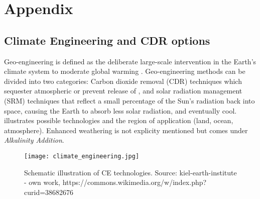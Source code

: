\chapter{Appendix}
\section{Climate Engineering and CDR options}\label{sec:app_ce}
Geo-engineering is defined as the deliberate large-scale intervention in the Earth's climate system to moderate global warming \citep{shepherd2009}. Geo-engineering methods can be divided into two categories: Carbon dioxide removal (CDR) techniques which sequester atmospheric  or prevent release of , and solar radiation management (SRM) techniques that reflect a small percentage of the Sun's radiation back into space, causing the Earth to absorb less solar radiation, and eventually cool.  illustrates possible technologies and the region of application (land, ocean, atmosphere). Enhanced weathering is not explicity mentioned but comes under \textit{Alkalinity Addition}. 
\begin{figure}[h]
\centering
\texttt{[image: climate\_engineering.jpg]}
\caption{Schematic illustration of CE technologies. Source: kiel-earth-institute - own work, https://commons.wikimedia.org/w/index.php?curid=38682676}
\label{fig:app_geo}
\end{figure}


